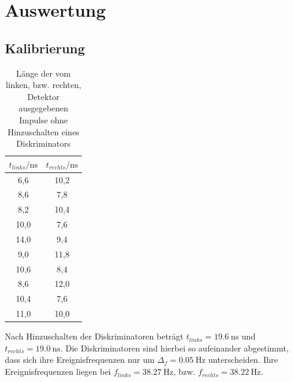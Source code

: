 \section{Auswertung}
\label{sec:Auswertung}
\subsection{Kalibrierung}
\begin{table}
  \caption{Länge der vom linken, bzw. rechten, Detektor ausgegebenen Impulse ohne Hinzuschalten eines Diskriminators}
  \label{tab:oD}
  \centering
  \begin{tabular}{|S|S|}
    \toprule
    $t_{links}/\si{\nano \second}$ & $t_{rechts}/\si{\nano \second}$\\
    ,6 & 10,2 \\
    8,6 & 7,8 \\
    8,2 & 10,4 \\
    10,0 & 7,6 \\
    14,0 & 9,4 \\
    9,0 & 11,8 \\
    10,6 & 8,4 \\
    8,6 & 12,0 \\
    10,4 & 7,6 \\
    11,0 & 10,0 \\
    \toprule
  \end{tabular}
\end{table}

Nach Hinzuschalten der Diskriminatoren beträgt $t_{links}= \SI{19,6}{\nano\second}$ und $t_{rechts} = \SI{19,0}{\nano \second}$. Die Diskriminatoren sind hierbei so aufeinander abgestimmt, dass sich ihre Ereignisfrequenzen nur um $\Delta_f = \SI{0,05}{\hertz}$ unterscheiden. Ihre Ereignisfrequenzen liegen bei $f_{links} = \SI{38.27}{\hertz}$, bzw. $f_{rechts}= \SI{38,22}{\hertz}$.

